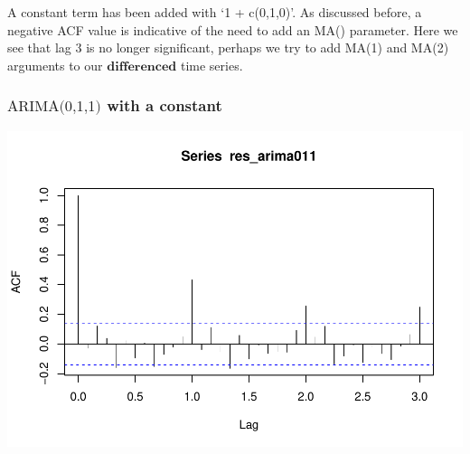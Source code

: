 \documentclass[
]{article}
\newenvironment{Shaded}{\begin{snugshade}}{\end{snugshade}}
\newcommand{\AttributeTok}[1]{\textcolor[rgb]{0.77,0.63,0.00}{#1}}
\newcommand{\DecValTok}[1]{\textcolor[rgb]{0.00,0.00,0.81}{#1}}
\newcommand{\FunctionTok}[1]{\textcolor[rgb]{0.00,0.00,0.00}{#1}}
\newcommand{\NormalTok}[1]{#1}
\newcommand{\OtherTok}[1]{\textcolor[rgb]{0.56,0.35,0.01}{#1}}
\newcommand{\SpecialCharTok}[1]{\textcolor[rgb]{0.00,0.00,0.00}{#1}}
\begin{document}
A constant term has been added with `1 + c(0,1,0)'. As discussed before,
a negative ACF value is indicative of the need to add an MA() parameter.
Here we see that lag 3 is no longer significant, perhaps we try to add
MA(1) and MA(2) arguments to our \(\textbf{differenced}\) time series.

\hypertarget{textarima011-with-a-constant}{%
\subsubsection{\texorpdfstring{\(\text{ARIMA(0,1,1)}\) with a
constant}{\textbackslash text\{ARIMA(0,1,1)\} with a constant}}\label{textarima011-with-a-constant}}

\begin{Shaded}
\end{Shaded}

\includegraphics{eighth_meeting_notes_files/figure-latex/arima011-1.pdf}
\end{document}
